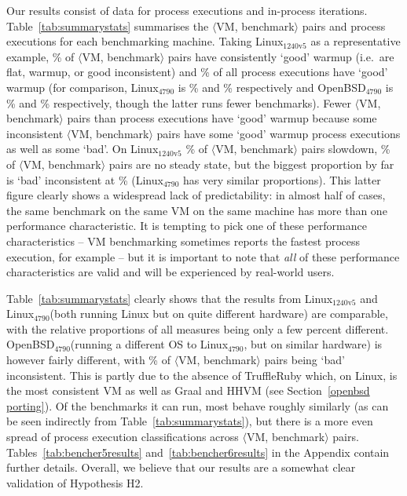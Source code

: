 \documentclass[acmsmall]{acmart}\settopmatter{printfolios=true}
\newcommand{\hyptwo}{H2\xspace}
\newcommand{\bencherfive}{Linux$_\mathrm{4790}$\xspace}
\newcommand{\benchersix}{OpenBSD$_\mathrm{4790}$\xspace}
\newcommand{\bencherseven}{Linux$_\mathrm{1240v5}$\xspace}
\newcommand{\vmbpair}{$\langle$VM, benchmark$\rangle$\xspace}
\begin{document}
Our results consist of data for \totalpexecs{} process executions and \totaliterations{} in-process
iterations. Table~\ref{tab:summarystats} summarises the \vmbpair pairs
and process executions for each benchmarking machine. Taking \bencherseven
as a representative example,
\bsevenresult\% of \vmbpair pairs have consistently `good' warmup (i.e.~are flat, warmup,
or good inconsistent) and
%
\result\% of all process executions have `good' warmup (for comparison, \bencherfive
is
\bfiveresult\% and
%
\result\% respectively and \benchersix is
\bsixresult\% and
%
\result\% respectively, though the latter runs fewer benchmarks).
Fewer \vmbpair pairs than process executions have `good'
warmup because some inconsistent \vmbpair pairs have some `good' warmup
process executions as well as some `bad'. On \bencherseven
\benchersevenvmbenchpairsslowdownpercentage\% of \vmbpair pairs slowdown,
\benchersevenvmbenchpairsnosteadystatepercentage\% of \vmbpair pairs are no steady state,
but the biggest proportion by far is `bad' inconsistent at \benchersevenvmbenchpairsbadinconsistentpercentage\%
(\bencherfive has very similar proportions). This latter figure clearly shows a
widespread lack of predictability: in almost half of cases, the same benchmark
on the same VM on the same machine has more than one performance characteristic.
It is tempting to pick one of these performance characteristics -- VM
benchmarking sometimes reports the fastest process execution, for example -- but
it is important to note that \emph{all} of these performance characteristics are
valid and will be experienced by real-world users.

Table~\ref{tab:summarystats} clearly shows that the results from \bencherseven
and \bencherfive (both running Linux but on quite different hardware) are
comparable, with the relative proportions of all measures being only a few
percent different. \benchersix (running a different OS to \bencherfive, but on similar hardware)
is however fairly different, with \benchersixvmbenchpairsbadinconsistentpercentage\%
of \vmbpair pairs being `bad' inconsistent. This is partly due to the absence of
TruffleRuby which, on Linux, is the most consistent VM as well as Graal and HHVM
(see Section~\ref{openbsd porting}). Of the benchmarks it can run, most behave
roughly similarly (as can be seen indirectly from Table~\ref{tab:summarystats}), but
there is a more even spread of process execution classifications across \vmbpair pairs.
Tables~\ref{tab:bencher5results} and~\ref{tab:bencher6results} in the Appendix
contain further details. Overall, we believe that our results are a
somewhat clear validation of Hypothesis \hyptwo.
\end{document}
